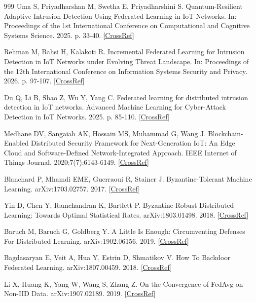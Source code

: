 \documentclass[cmc,article,submit,moreauthors,pdftex]{Definitions/tsp}
\begin{document}
\begin{thebibliography}{999}
Uma S, Priyadharshan M, Swetha E, Priyadharshini S. Quantum-Resilient Adaptive Intrusion Detection Using Federated Learning in IoT Networks. In: Proceedings of the 1st International Conference on Computational and Cognitive Systems Science. 2025. p. 33-40. [\href{https://doi.org/10.5220/0014930000005024}{CrossRef}]

Rehman M, Bahsi H, Kalakoti R. Incremental Federated Learning for Intrusion Detection in IoT Networks under Evolving Threat Landscape. In: Proceedings of the 12th International Conference on Information Systems Security and Privacy. 2026. p. 97-107. [\href{https://doi.org/10.5220/0014475900004061}{CrossRef}]

Du Q, Li B, Shao Z, Wu Y, Yang C. Federated learning for distributed intrusion detection in IoT networks. Advanced Machine Learning for Cyber-Attack Detection in IoT Networks. 2025. p. 85-110. [\href{https://doi.org/10.1016/b978-0-44-329032-9.00009-9}{CrossRef}]

Medhane DV, Sangaiah AK, Hossain MS, Muhammad G, Wang J. Blockchain-Enabled Distributed Security Framework for Next-Generation IoT: An Edge Cloud and Software-Defined Network-Integrated Approach. IEEE Internet of Things Journal. 2020;7(7):6143-6149. [\href{https://doi.org/10.1109/jiot.2020.2977196}{CrossRef}]

Blanchard P, Mhamdi EME, Guerraoui R, Stainer J. Byzantine-Tolerant Machine Learning. arXiv:1703.02757. 2017. [\href{https://doi.org/10.48550/arXiv.1703.02757}{CrossRef}]

Yin D, Chen Y, Ramchandran K, Bartlett P. Byzantine-Robust Distributed Learning: Towards Optimal Statistical Rates. arXiv:1803.01498. 2018. [\href{https://doi.org/10.48550/arXiv.1803.01498}{CrossRef}]

Baruch M, Baruch G, Goldberg Y. A Little Is Enough: Circumventing Defenses For Distributed Learning. arXiv:1902.06156. 2019. [\href{https://doi.org/10.48550/arXiv.1902.06156}{CrossRef}]

Bagdasaryan E, Veit A, Hua Y, Estrin D, Shmatikov V. How To Backdoor Federated Learning. arXiv:1807.00459. 2018. [\href{https://doi.org/10.48550/arXiv.1807.00459}{CrossRef}]

Li X, Huang K, Yang W, Wang S, Zhang Z. On the Convergence of FedAvg on Non-IID Data. arXiv:1907.02189. 2019. [\href{https://doi.org/10.48550/arXiv.1907.02189}{CrossRef}]


\end{thebibliography}
\end{document}
